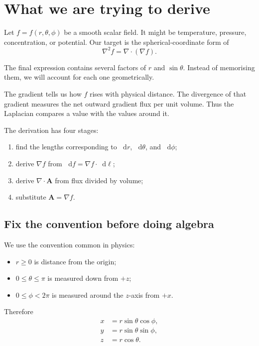 \documentclass[11pt,a4paper]{article}
\newcommand{\dd}{\mathop{}\!\mathrm d}
\begin{document}
\setcounter{tocdepth}{1}
\tableofcontents
\thispagestyle{fancy}
\clearpage

\section{What we are trying to derive}

Let \(f=f(r,\theta,\phi)\) be a smooth scalar field. It might be temperature, pressure, concentration, or potential. Our target is the spherical-coordinate form of
\[
  \nabla^2f=\nabla\cdot(\nabla f).
\]

The final expression contains several factors of \(r\) and \(\sin\theta\). Instead of memorising them, we will account for each one geometrically.

\begin{idea}
The gradient tells us how \(f\) rises with physical distance. The divergence of that gradient measures the net outward gradient flux per unit volume. Thus the Laplacian compares a value with the values around it.
\end{idea}

The derivation has four stages:
\begin{enumerate}
  \item find the lengths corresponding to \(\dd r\), \(\dd\theta\), and \(\dd\phi\);
  \item derive \(\nabla f\) from \(\dd f=\nabla f\cdot\dd\bm\ell\);
  \item derive \(\nabla\cdot\bm A\) from flux divided by volume;
  \item substitute \(\bm A=\nabla f\).
\end{enumerate}

\subsection{Fix the convention before doing algebra}

We use the convention common in physics:
\begin{itemize}
  \item \(r\geq0\) is distance from the origin;
  \item \(0\leq\theta\leq\pi\) is measured down from \(+z\);
  \item \(0\leq\phi<2\pi\) is measured around the \(z\)-axis from \(+x\).
\end{itemize}
Therefore
\begin{align*}
  x&=r\sin\theta\cos\phi,\\
  y&=r\sin\theta\sin\phi,\\
  z&=r\cos\theta.
\end{align*}
\end{document}
